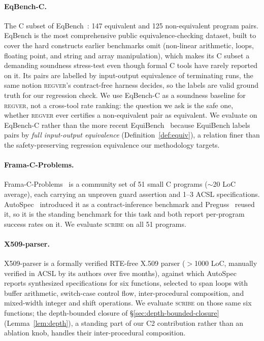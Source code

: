 \documentclass[conference]{IEEEtran}
\theoremstyle{definition}
\theoremstyle{remark}
\begin{document}
\paragraph{EqBench-C.} The C subset of
EqBench~\cite{badihi2021eqbench}: 147 equivalent and 125
non-equivalent program pairs. EqBench is the most comprehensive public
equivalence-checking dataset, built to cover the hard constructs
earlier benchmarks omit (non-linear arithmetic, loops, floating point,
and string and array manipulation), which makes its C subset a
demanding soundness stress-test even though formal C tools have rarely
reported on it. Its pairs are labelled by input-output equivalence of
terminating runs, the same notion \textsc{regver}'s contract-free
harness decides, so the labels are valid ground truth for our
regression check. We use EqBench-C as a soundness baseline
for \textsc{regver}, not a cross-tool rate ranking: the question we
ask is the safe one, whether \textsc{regver} ever certifies a
non-equivalent pair as equivalent. We evaluate on EqBench-C rather
than the more recent EquiBench~\cite{wei2025equibench} because
EquiBench labels pairs by \emph{full input-output equivalence}
(Definition~\ref{def:equiv}), a relation finer than the
safety-preserving regression equivalence our methodology targets.

\paragraph{Frama-C-Problems.}
Frama-C-Problems~\cite{patnaik2020framacproblems} is a community set
of 51 small C programs ($\sim$20 LoC average), each carrying an
unproven guard assertion and 1--3 ACSL specifications.
AutoSpec~\cite{wen2024autospec} introduced it as a contract-inference
benchmark and Preguss~\cite{wang2025preguss} reused it, so it is the
standing benchmark for this task and both report per-program success
rates on it. We evaluate \textsc{scribe} on all 51 programs.

\paragraph{X509-parser.} X509-parser is a formally verified RTE-free X.509
parser ($>$1000 LoC, manually verified in ACSL by its authors over
five months), against which AutoSpec~\cite{wen2024autospec} reports
synthesized specifications for six functions, selected to span loops
with buffer arithmetic, switch-case control flow, inter-procedural
composition, and mixed-width integer and shift operations. We
evaluate \textsc{scribe} on those same six functions; the
depth-bounded closure of \S\ref{sec:depth-bounded-closure}
(Lemma~\ref{lem:depth}), a standing
part of our C2 contribution rather than an ablation knob, handles
their inter-procedural composition.
\end{document}
